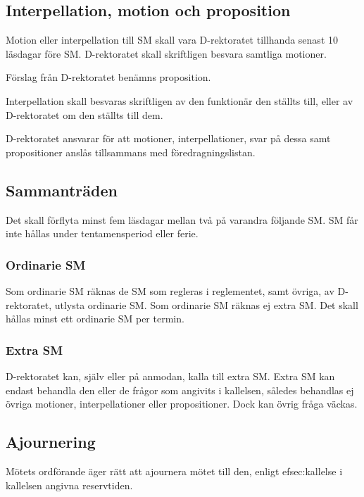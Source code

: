 \documentclass[a4paper,12pt]{article}
\begin{document}
\subsection{Interpellation, motion och proposition}

Motion eller interpellation till SM skall vara D-rektoratet tillhanda senast 10 läsdagar före SM. D-rektoratet skall skriftligen besvara samtliga motioner.

Förslag från D-rektoratet benämns proposition.

Interpellation skall besvaras skriftligen av den funktionär den ställts till, eller av D-rektoratet om den ställts till dem.

D-rektoratet ansvarar för att motioner, interpellationer, svar på dessa samt propositioner anslås tillsammans med föredragningslistan.

\subsection{Sammanträden}

Det skall förflyta minst fem läsdagar mellan två på varandra följande SM. SM får inte hållas under tentamensperiod eller ferie.

\subsubsection{Ordinarie SM}
\label{sec:ordinariesm}

Som ordinarie SM räknas de SM som regleras i reglementet, samt övriga, av D-rektoratet, utlysta ordinarie SM. Som ordinarie SM räknas ej extra SM. Det skall hållas minst ett ordinarie SM per termin.

\subsubsection{Extra SM}

D-rektoratet kan, själv eller på anmodan, kalla till extra SM. Extra SM kan endast behandla den eller de frågor som angivits i kallelsen, således behandlas ej övriga motioner, interpellationer eller propositioner. Dock kan övrig fråga väckas.

\subsection{Ajournering}
\label{sec:ajournering}

Mötets ordförande äger rätt att ajournera mötet till den, enligt 
ef{sec:kallelse} i kallelsen angivna reservtiden.
\end{document}
